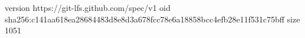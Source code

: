 version https://git-lfs.github.com/spec/v1
oid sha256:c141aa618ea28684483d8e8d3a678fcc78e6a18858bcc4efb28e11f531c75bff
size 1051

